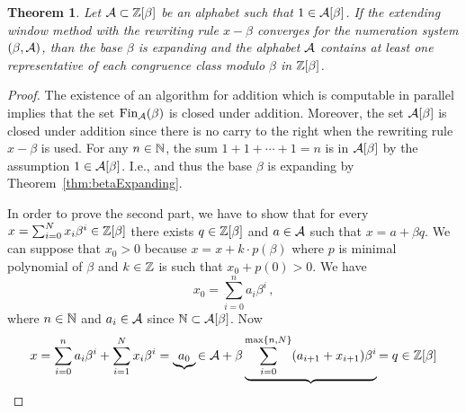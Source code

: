 \documentclass{article}
\newtheorem{theo}{Theorem}
\begin{document}
\begin{theo}
Let $\mathcal{A}\subset \mathbb{Z}[\beta]$ be an alphabet such that $1\in \mathcal{A}[\beta]$. If the extending window method with the rewriting rule $x-\beta$ converges for the numeration system $(\beta, \mathcal{A})$, than the base $\beta$ is expanding and the alphabet $\mathcal{A}$ contains at least one representative of each congruence class modulo $\beta$ in $\mathbb{Z}[\beta]$. 
\end{theo}
\begin{proof}
The existence of an algorithm for addition which is computable in parallel implies that the set $\text{Fin}_{\mathcal{A}}(\beta)$ is closed under addition. Moreover, the set $\mathcal{A}[\beta]$ is closed under addition since there is no carry to the right when the rewriting rule $x-\beta$ is used. For any $n\in\mathbb{N}$, the sum $1+1+\cdots +1=n$ is in $\mathcal{A}[\beta]$ by the assumption $1\in \mathcal{A}[\beta]$. I.e.,  and thus the base $\beta$ is expanding by Theorem~\ref{thm:betaExpanding}.

In order to prove the second part, we have to show that for every $x=\sum_{i=0}^N x_i \beta^i \in\mathbb{Z}[\beta]$ there exists $q\in\mathbb{Z}[\beta]$ and $a\in\mathcal{A}$ such that $x=a+\beta q$. We can suppose that $x_0> 0$ because $x=x+k\cdot p(\beta)$ where $p$ is minimal polynomial of $\beta$ and  $k\in\mathbb{Z}$ is such that $x_0+p(0)>0$. We have
$$
x_0=\sum_{i=0}^{n}a_i\beta^i\,,
    $$
    where $n\in\mathbb{N}$ and $a_i\in\mathcal{A}$ since $\mathbb{N}\subset \mathcal{A}[\beta]$. Now
    $$
    x=\sum_{i=0}^{n}a_i\beta^i + \sum_{i=1}^N x_i \beta^i=\underbrace{a_0}{\in\mathcal{A}} + \beta \underbrace{\sum_{i=0}^{\max\{n,N\}}(a_{i+1}+x_{i+1})\beta^i}{=q\in\mathbb{Z}[\beta]}
    $$
\end{proof}
\end{document}
